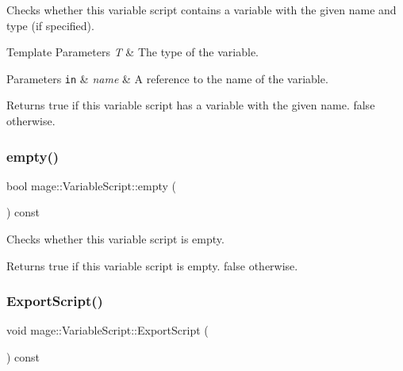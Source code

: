Checks whether this variable script contains a variable with the given name and type (if specified).


\begin{DoxyTemplParams}{Template Parameters}
{\em T} & The type of the variable. \\
\hline
\end{DoxyTemplParams}

\begin{DoxyParams}[1]{Parameters}
\mbox{\tt in}  & {\em name} & A reference to the name of the variable. \\
\hline
\end{DoxyParams}
\begin{DoxyReturn}{Returns}
{\ttfamily true} if this variable script has a variable with the given name. {\ttfamily false} otherwise. 
\end{DoxyReturn}
\hypertarget{classmage_1_1_variable_script_a8a3f47783455cd6264dfc996887fd0f0}{}\label{classmage_1_1_variable_script_a8a3f47783455cd6264dfc996887fd0f0} 
\subsubsection{\texorpdfstring{empty()}{empty()}}
{\footnotesize\ttfamily bool mage\+::\+Variable\+Script\+::empty (\begin{DoxyParamCaption}{ }\end{DoxyParamCaption}) const\hspace{0.3cm}{\ttfamily [noexcept]}}

Checks whether this variable script is empty.

\begin{DoxyReturn}{Returns}
{\ttfamily true} if this variable script is empty. {\ttfamily false} otherwise. 
\end{DoxyReturn}
\hypertarget{classmage_1_1_variable_script_ab12b7f789f6af2b301ff350fa401b324}{}\label{classmage_1_1_variable_script_ab12b7f789f6af2b301ff350fa401b324} 
\subsubsection{\texorpdfstring{Export\+Script()}{ExportScript()}\hspace{0.1cm}{\footnotesize\ttfamily [1/2]}}
{\footnotesize\ttfamily void mage\+::\+Variable\+Script\+::\+Export\+Script (\begin{DoxyParamCaption}{ }\end{DoxyParamCaption}) const}


